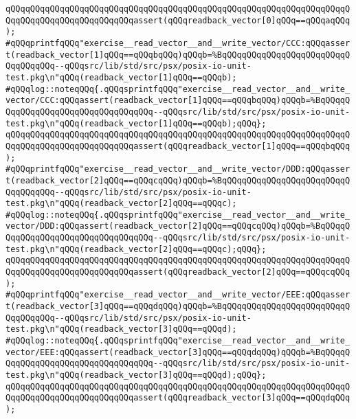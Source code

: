 \verb|qQQqqQQqqQQqqQQqqQQqqQQqqQQqqQQqqQQqqQQqqQQqqQQqqQQqqQQqqQQqqQQqqQQqqQQqqQQqqQQqqQQqqQQqqQQqqQQqassert(qQQqreadback_vector[0]qQQq==qQQqaqQQq);|\newline
\verb|#qQQqprintfqQQq"exercise__read_vector__and__write_vector/CCC:qQQqassert(readback_vector[1]qQQq==qQQqbqQQq)qQQqb=%BqQQqqQQqqQQqqQQqqQQqqQQqqQQqqQQqqQQq--qQQqsrc/lib/std/src/psx/posix-io-unit-test.pkg\n"qQQq(readback_vector[1]qQQq==qQQqb);|\newline
\verb|#qQQqlog::noteqQQq{.qQQqsprintfqQQq"exercise__read_vector__and__write_vector/CCC:qQQqassert(readback_vector[1]qQQq==qQQqbqQQq)qQQqb=%BqQQqqQQqqQQqqQQqqQQqqQQqqQQqqQQqqQQq--qQQqsrc/lib/std/src/psx/posix-io-unit-test.pkg\n"qQQq(readback_vector[1]qQQq==qQQqb);qQQq};|\newline
\verb|qQQqqQQqqQQqqQQqqQQqqQQqqQQqqQQqqQQqqQQqqQQqqQQqqQQqqQQqqQQqqQQqqQQqqQQqqQQqqQQqqQQqqQQqqQQqqQQqassert(qQQqreadback_vector[1]qQQq==qQQqbqQQq);|\newline
\verb|#qQQqprintfqQQq"exercise__read_vector__and__write_vector/DDD:qQQqassert(readback_vector[2]qQQq==qQQqcqQQq)qQQqb=%BqQQqqQQqqQQqqQQqqQQqqQQqqQQqqQQqqQQq--qQQqsrc/lib/std/src/psx/posix-io-unit-test.pkg\n"qQQq(readback_vector[2]qQQq==qQQqc);|\newline
\verb|#qQQqlog::noteqQQq{.qQQqsprintfqQQq"exercise__read_vector__and__write_vector/DDD:qQQqassert(readback_vector[2]qQQq==qQQqcqQQq)qQQqb=%BqQQqqQQqqQQqqQQqqQQqqQQqqQQqqQQqqQQq--qQQqsrc/lib/std/src/psx/posix-io-unit-test.pkg\n"qQQq(readback_vector[2]qQQq==qQQqc);qQQq};|\newline
\verb|qQQqqQQqqQQqqQQqqQQqqQQqqQQqqQQqqQQqqQQqqQQqqQQqqQQqqQQqqQQqqQQqqQQqqQQqqQQqqQQqqQQqqQQqqQQqqQQqassert(qQQqreadback_vector[2]qQQq==qQQqcqQQq);|\newline
\verb|#qQQqprintfqQQq"exercise__read_vector__and__write_vector/EEE:qQQqassert(readback_vector[3]qQQq==qQQqdqQQq)qQQqb=%BqQQqqQQqqQQqqQQqqQQqqQQqqQQqqQQqqQQq--qQQqsrc/lib/std/src/psx/posix-io-unit-test.pkg\n"qQQq(readback_vector[3]qQQq==qQQqd);|\newline
\verb|#qQQqlog::noteqQQq{.qQQqsprintfqQQq"exercise__read_vector__and__write_vector/EEE:qQQqassert(readback_vector[3]qQQq==qQQqdqQQq)qQQqb=%BqQQqqQQqqQQqqQQqqQQqqQQqqQQqqQQqqQQq--qQQqsrc/lib/std/src/psx/posix-io-unit-test.pkg\n"qQQq(readback_vector[3]qQQq==qQQqd);qQQq};|\newline
\verb|qQQqqQQqqQQqqQQqqQQqqQQqqQQqqQQqqQQqqQQqqQQqqQQqqQQqqQQqqQQqqQQqqQQqqQQqqQQqqQQqqQQqqQQqqQQqqQQqassert(qQQqreadback_vector[3]qQQq==qQQqdqQQq);|\newline
